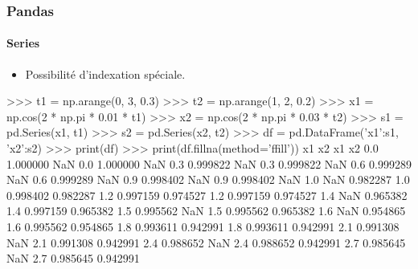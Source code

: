 \begin{frame}[fragile]
\frametitle{Pandas}
\framesubtitle{Series}
\begin{itemize}
 \item Possibilité d'indexation spéciale.
\end{itemize}

\begin{pythonConsole}
>>> t1 = np.arange(0, 3, 0.3)
>>> t2 = np.arange(1, 2, 0.2)
>>> x1 = np.cos(2 * np.pi * 0.01 * t1)
>>> x2 = np.cos(2 * np.pi * 0.03 * t2)
>>> s1 = pd.Series(x1, t1)
>>> s2 = pd.Series(x2, t2)
>>> df = pd.DataFrame({'x1':s1, 'x2':s2})
>>> print(df)                              >>> print(df.fillna(method='ffill'))
           x1        x2                               x1        x2
0.0  1.000000       NaN                    0.0  1.000000       NaN
0.3  0.999822       NaN                    0.3  0.999822       NaN
0.6  0.999289       NaN                    0.6  0.999289       NaN
0.9  0.998402       NaN                    0.9  0.998402       NaN
1.0       NaN  0.982287                    1.0  0.998402  0.982287
1.2  0.997159  0.974527                    1.2  0.997159  0.974527
1.4       NaN  0.965382                    1.4  0.997159  0.965382
1.5  0.995562       NaN                    1.5  0.995562  0.965382
1.6       NaN  0.954865                    1.6  0.995562  0.954865
1.8  0.993611  0.942991                    1.8  0.993611  0.942991
2.1  0.991308       NaN                    2.1  0.991308  0.942991
2.4  0.988652       NaN                    2.4  0.988652  0.942991
2.7  0.985645       NaN                    2.7  0.985645  0.942991

\end{pythonConsole}
\end{frame}
